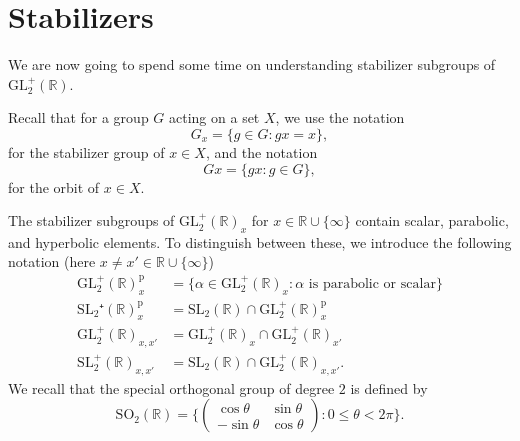 \documentclass{article}
\theoremstyle{definition}
\begin{document}
\section{Stabilizers}
We are now going to spend some time on understanding stabilizer subgroups of $\mathrm{GL}_2^+(\mathbb{R})$.

Recall that for a group $G$ acting on a set $X$, we use the notation
\[G_x=\{g\in G:gx=x\},\]
for the stabilizer group of $x\in X$, and the notation
\[Gx=\{gx:g\in G\},\]
for the orbit of $x\in X$.

The stabilizer subgroups of $\mathrm{GL}_2^+(\mathbb{R})_x$ for $x\in\mathbb{R}\cup\{\infty\}$ contain scalar, parabolic, and hyperbolic elements. To distinguish between these, we introduce the following notation (here $x\neq x'\in\mathbb{R}\cup\{\infty\}$)
\begin{align*}
	\mathrm{GL}_2^+(\mathbb{R})_x^{\mathrm{p}}&=\{\alpha\in\mathrm{GL}_2^+(\mathbb{R})_x:\alpha\text{ is parabolic or scalar}\}\\
	\mathrm{SL}_2⁺(\mathbb{R})_x^\mathrm{p}&=\mathrm{SL}_2(\mathbb{R})\cap\mathrm{GL}_2^+(\mathbb{R})_x^\mathrm{p}\\
	\mathrm{GL}_2^+(\mathbb{R})_{x,x'}&=\mathrm{GL}_2^+(\mathbb{R})_x\cap\mathrm{GL}_2^+(\mathbb{R})_{x'}\\
	\mathrm{SL}_2^+(\mathbb{R})_{x,x'}&=\mathrm{SL}_2(\mathbb{R})\cap\mathrm{GL}_2^+(\mathbb{R})_{x,x'}.
\end{align*}
We recall that the special orthogonal group of degree $2$ is defined by
\[\mathrm{SO}_2(\mathbb{R})=\Big\{\!\begin{pmatrix}\cos\theta&\sin\theta\\-\sin\theta&\cos\theta\end{pmatrix}\!:0\leq\theta<2\pi\Big\}.\]
\end{document}

